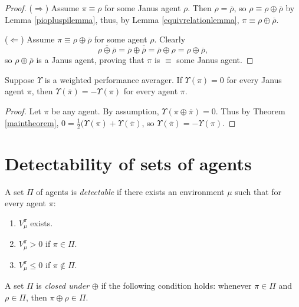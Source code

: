 \documentclass[runningheads]{llncs}
\begin{document}
\begin{proof}
    ($\Rightarrow$)
    Assume $\pi\equiv\rho$ for some Janus agent $\rho$.
    Then $\rho=\overline{\rho}$, so $\rho\equiv \rho\oplus\overline{\rho}$ by
    Lemma \ref{piopluspilemma}, thus, by Lemma \ref{equivrelationlemma},
    $\pi\equiv\rho\oplus\overline{\rho}$.

    ($\Leftarrow$)
    Assume $\pi\equiv\rho\oplus\overline{\rho}$ for some agent $\rho$.
    Clearly
    \[
        \overline{\rho\oplus\overline{\rho}}
        =
        \overline{\rho}\oplus\overline{\overline{\rho}}
        =
        \overline{\rho}\oplus\rho
        =
        \rho\oplus\overline{\rho},
    \]
    so $\rho\oplus\overline{\rho}$ is a Janus agent, proving that
    $\pi$ is $\equiv$ some Janus agent.
\end{proof}

\begin{theorem}
    Suppose $\Upsilon$ is a weighted performance averager.
    If $\Upsilon(\pi)=0$ for every Janus agent $\pi$,
    then $\Upsilon(\overline{\pi})=-\Upsilon(\pi)$
    for every agent $\pi$.
\end{theorem}

\begin{proof}
    Let $\pi$ be any agent.
    By assumption, $\Upsilon(\pi\oplus\overline{\pi})=0$.
    Thus by Theorem \ref{maintheorem},
    $0=\frac12(\Upsilon(\pi)+\Upsilon(\overline{\pi})$,
    so $\Upsilon(\overline{\pi})=-\Upsilon(\pi)$.
\end{proof}


\section{Detectability of sets of agents}

\begin{definition}
\label{incentivizabilitydefn}
    A set $\Pi$ of agents is \emph{detectable} if there exists
    an environment $\mu$ such that for every agent $\pi$:
    \begin{enumerate}
        \item
        $V^\pi_\mu$ exists.
        \item
        $V^\pi_\mu>0$ if $\pi\in\Pi$.
        \item
        $V^\pi_\mu\leq 0$ if $\pi\not\in\Pi$.
    \end{enumerate}
\end{definition}

\begin{definition}
    A set $\Pi$ is \emph{closed under $\oplus$} if the following
    condition holds: whenever $\pi\in\Pi$ and $\rho\in\Pi$,
    then $\pi\oplus\rho\in\Pi$.
\end{definition}
\end{document}
